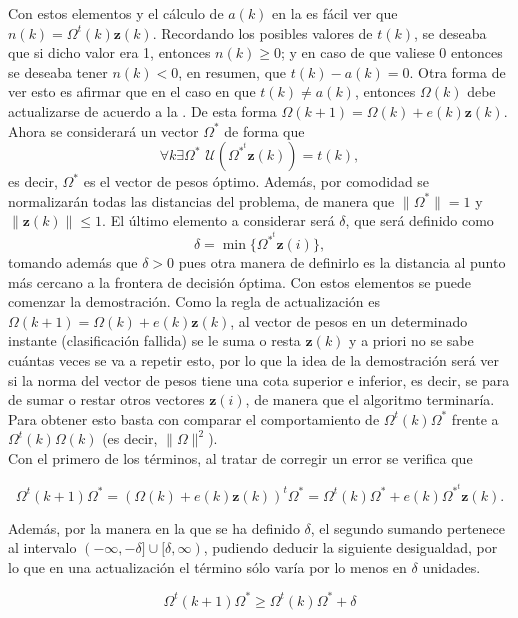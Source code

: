 		Con estos elementos y el cálculo de $a(k)$ en la  es fácil ver que $n(k) = \Omega^t(k)\textbf{z}(k)$. Recordando los posibles valores de $t(k)$, se deseaba que si dicho valor era 1, entonces $n(k) \geq 0$; y en caso de que valiese 0 entonces se deseaba tener $n(k) < 0$, en resumen, que $t(k) - a(k) = 0$. Otra forma de ver esto es afirmar que en el caso en que $t(k) \neq a(k)$, entonces $\Omega(k)$ debe actualizarse de acuerdo a la . De esta forma $\Omega(k + 1) = \Omega(k) + e(k)\textbf{z}(k)$. Ahora se considerará un vector $\Omega^*$ de forma que 
		$$
		\forall k \exists \Omega^* \,\, \mathcal{U}(\Omega^{*^t}\textbf{z}(k)) = t(k),
		$$
		es decir, $\Omega^*$ es el vector de pesos óptimo. Además, por comodidad se normalizarán todas las distancias del problema, de manera que $\|\Omega^{*}\| = 1$ y $\|\textbf{z}(k)\| \leq 1$. El último elemento a considerar será $\delta$, que será definido como
		$$
		\delta = \min\lbrace\Omega^{*^t}\textbf{z}(i)\rbrace, 
		$$
		tomando además que $\delta > 0$ pues otra manera de definirlo es la distancia al punto más cercano a la frontera de decisión óptima. Con estos elementos se puede comenzar la demostración. Como la regla de actualización es $\Omega(k + 1) = \Omega(k) + e(k)\textbf{z}(k)$, al vector de pesos en un determinado instante (clasificación fallida) se le suma o resta $\textbf{z}(k)$ y a priori no se sabe cuántas veces se va a repetir esto, por lo que la idea de la demostración será ver si la norma del vector de pesos tiene una cota superior e inferior, es decir, se para de sumar o restar otros vectores $\textbf{z}(i)$, de manera que el algoritmo terminaría. Para obtener esto basta con comparar el comportamiento de $\Omega^t(k) \Omega^*$ frente a $\Omega^t(k)\Omega(k)$ (es decir, $\|\Omega\|^2$). \\
		
		Con el primero de los términos, al tratar de corregir un error se verifica que
		
		$$
		\Omega^t(k+1)\Omega^* = (\Omega(k) + e(k)\textbf{z}(k))^t \Omega^* = \Omega^t(k)\Omega^* + e(k)\Omega^{*^t}\textbf{z}(k). 
		$$
		
		Además, por la manera en la que se ha definido $\delta$, el segundo sumando pertenece al intervalo $(-\infty, -\delta] \cup [\delta, \infty)$, pudiendo deducir la siguiente desigualdad, por lo que en una actualización el término sólo varía por lo menos en $\delta$ unidades.  
		
		\begin{equation}
			\label{eq:inf_delta}
			\Omega^t(k+1)\Omega^* \geq \Omega^t(k)\Omega^* + \delta
		\end{equation}
		
